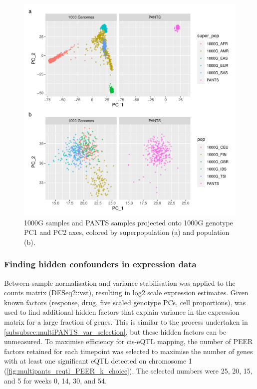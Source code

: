 
\begin{figure}
    \centering
    \includegraphics[width=1.0\textwidth,page=1]{mainmatter/figures/chapter_04/pants_samples.sampleids_cleaned_to_lowercase.filtered.GRCh38.sorted.multiPANTS.projection_1000G_pca.pdf}
    \caption{1000G samples and PANTS samples projected onto 1000G genotype PC1 and PC2 axes, colored by superpopulation (a) and population (b).}
    \label{fig:multipants_genotype_akt_1000g_pca}
\end{figure}

\subsubsection{Finding hidden confounders in expression data}

Between-sample normalisation and variance stabilisation was applied to the counts matrix (DESeq2::vst), resulting in log2 scale expression estimates.
Given known factors (response, drug, five scaled genotype \glspl{PC}, cell proportions), 
 was used to find additional hidden factors that explain variance in the expression matrix for a large fraction of genes.
This is similar to the process undertaken in \autoref{subsubsec:multiPANTS_var_selection}, but these hidden factors can be unmeasured.
To maximise efficiency for cis-\gls{eQTL} mapping, 
the number of PEER factors retained for each timepoint was selected to maximise the number of genes with at least one significant \gls{eQTL} detected on chromosome 1 (\autoref{fig:multipants_reqtl_PEER_k_choice}).
The selected numbers were 25, 20, 15, and 5 for weeks 0, 14, 30, and 54.

